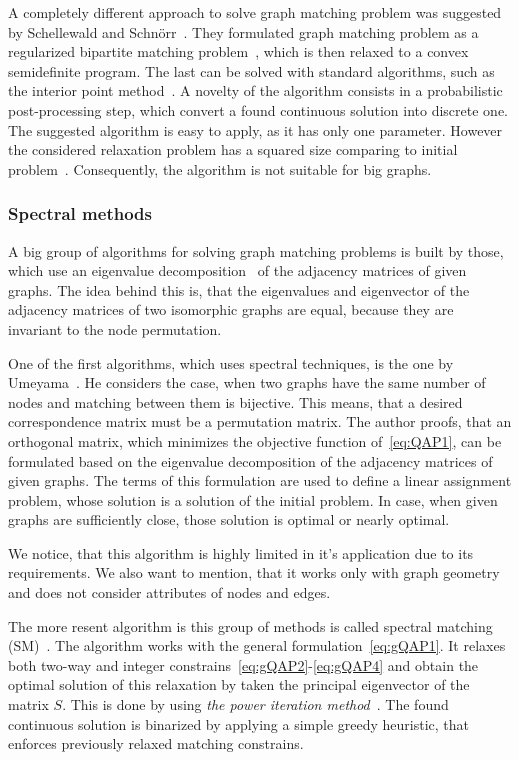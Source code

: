 A completely different approach to solve graph matching problem was suggested by Schellewald and Schn\"orr~\cite{Schellewald2005}. They formulated graph matching problem as a regularized bipartite matching problem~\cite{Diestel2000}, which is then relaxed to a convex semidefinite program. The last can be solved with standard algorithms, such as the interior point method~\cite{Book_ConvOpt}. A novelty of the algorithm consists in a probabilistic post-processing step, which convert a found continuous solution  into discrete one. The suggested algorithm is easy to apply, as it has only one parameter. However the considered relaxation problem has a squared size comparing to initial problem~\cite{Cour2006}. Consequently, the algorithm is not suitable for big graphs.
\subsubsection{Spectral methods}
A big group of algorithms for solving graph matching problems is built by those, which use an eigenvalue decomposition~\cite{Book_ConvOpt} of the adjacency matrices of given graphs. The idea behind this is, that the eigenvalues and eigenvector of the adjacency matrices of two isomorphic graphs are equal, because they are invariant to the node permutation.

One of the first algorithms, which uses spectral techniques, is the one by Umeyama\newline~\cite{Umeyam1988}. He considers the case, when two graphs have the same number of nodes and matching between them is bijective. This means, that a desired correspondence matrix must be a permutation matrix. The author proofs, that an orthogonal matrix, which minimizes the objective function of~\eqref{eq:QAP1}, can be formulated based on the eigenvalue decomposition of the adjacency matrices of given graphs. The terms of this formulation are used to define a linear assignment problem, whose solution is a solution of the initial problem. In case, when given graphs are sufficiently close, those solution is optimal or nearly optimal.

We notice, that this algorithm is highly limited in it's application due to its requirements. We also want to mention, that it works only with graph geometry and does not consider attributes of nodes and edges.

The more resent algorithm is this group of methods is called spectral matching (SM)~\cite{Leordeanu2005_SM}. The algorithm works with the general formulation~\eqref{eq:gQAP1}. It relaxes both two-way and integer constrains~\eqref{eq:gQAP2}-\eqref{eq:gQAP4} and obtain the optimal solution of this relaxation by taken the principal eigenvector of the matrix $S$. This is done by using \emph{the power iteration method}~\cite{PowerIteration}. The found continuous solution is binarized by applying a simple greedy heuristic, that enforces previously relaxed matching constrains.


